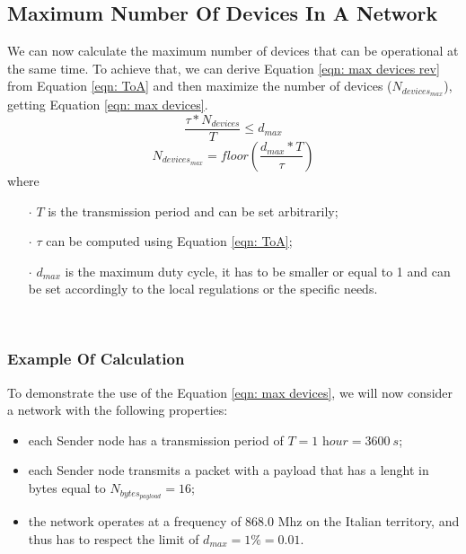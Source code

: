 \subsection{Maximum Number Of Devices In A Network}
We can now calculate the maximum number of devices that can be operational at the same time. To achieve that, we can
derive Equation \ref{eqn: max devices rev} from Equation \ref{eqn: ToA} and then maximize the number of devices
($\mathit{N_{devices_{max}}}$), getting Equation \ref{eqn: max devices}.
\begin{equation}
    \label{eqn: max devices rev}
    \frac{\tau * \mathit{N_{devices}}}{T} \leq \mathit{d_{max}}
\end{equation}
\begin{equation}
    \label{eqn: max devices}
    N_{devices_{max}} = \textit{floor} \left( \frac{\mathit{d_{max}} * T}{\tau} \right)
\end{equation}
where
\begin{itemize}[noitemsep,nolistsep]
    \item[\boldmath$\cdot$] $T$ is the transmission period and can be set arbitrarily;
    \item[\boldmath$\cdot$] $\tau$ can be computed using Equation \ref{eqn: ToA};
    \item[\boldmath$\cdot$] $\mathit{d_{max}}$ is the maximum duty cycle, it has to be smaller or equal to 1 and can be
        set accordingly to the local regulations or the specific needs.
\end{itemize}
\\

\subsubsection{Example Of Calculation}
To demonstrate the use of the Equation \ref{eqn: max devices}, we will now consider a network with the following
properties:
\begin{itemize}
    \item each Sender node has a transmission period of $T = 1 \textit{ hour} = 3600\ s$;
    \item each Sender node transmits a packet with a payload that has a lenght in bytes equal to $\mathit{N_{bytes_{payload}}} = 16$;
    \item the network operates at a frequency of 868.0 Mhz on the Italian territory, and thus has to respect the limit
        of $\mathit{d_{max}} = 1\% = 0.01$.
\end{itemize}


